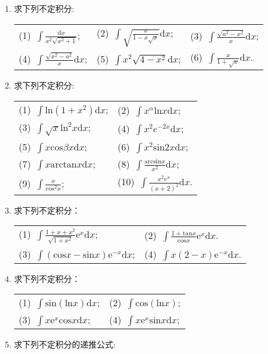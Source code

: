 \begin{enumerate}
\begin{table}[H]
\begin{tabular}{llll}
\end{tabular}
\end{table}
\item 求下列不定积分:
\begin{table}[H]
	\begin{tabular}{lll}
		(1)\ $\int \frac{\mathrm{d}x}{x^2\sqrt{x^2+1}}$;\qquad \qquad \qquad &(2)\ $\int \sqrt{\frac{x}{1-x\sqrt{x}}}\mathrm{d}x$;\qquad \qquad \qquad&(3)\ $\int \frac{\sqrt{a^2-x^2}}{x}\mathrm{d}x$;\\
		(4)\ $\int \frac{\sqrt{x^2-a^2}}{x}\mathrm{d}x$;\qquad \qquad \qquad&(5)\ $\int x^2\sqrt{4-x^2}\mathrm{d}x$;\qquad \qquad &(6)\ $\int \frac{x}{1+\sqrt{x}}\mathrm{d}x$.
	\end{tabular}
\end{table}
\item 求下列不定积分:
\begin{table}[H]
	\begin{tabular}{ll}
		(1)\ $\int \mathrm{ln}(1+x^2)\mathrm{d}x$;\qquad \qquad \qquad \qquad &(2)\ $\int x^\alpha\mathrm{ln}x\mathrm{d}x$;\\
		(3)\ $\int \sqrt{x}\mathrm{ln}^2x\mathrm{d}x$;\qquad \qquad \qquad \qquad &(4)\ $\int x^2e^{-2x}\mathrm{d}x$;\\
		(5)\ $\int x\mathrm{cos}\beta x\mathrm{d}x$;\qquad \qquad \qquad \qquad &(6)\ $\int x^2\mathrm{sin}2x\mathrm{d}x$;\\
		(7)\ $\int x\mathrm{arctan}x \mathrm{d}x$;\qquad \qquad \qquad \qquad &(8)\ $\int \frac{\mathrm{arcsin}x}{x^2}\mathrm{d}x$;\\
		(9)\ $\int \frac{x}{\mathrm{cos}^2x}$;\qquad \qquad \qquad \qquad &(10)\ $\int \frac{x^2e^x}{(x+2)^2}\mathrm{d}x$.
	\end{tabular}
\end{table}
\item 求下列不定积分：
\begin{table}[H]
	\begin{tabular}{ll}
(1)\ $\int \frac{1+x+x^2}{\sqrt{1+x^2}}\mathrm{e}^x\mathrm{d}x$;\qquad \qquad \qquad \qquad &(2)\ $\int \frac{1+\mathrm{tan}x}{\mathrm{cos}x}\mathrm{e}^x\mathrm{d}x$.\\
(3)\ $\int (\mathrm{cos}x-\mathrm{sin}x)\mathrm{e}^{-x}\mathrm{d}x$;\qquad \qquad \qquad \qquad &(4)\ $\int x(2-x)\mathrm{e}^{-x}\mathrm{d}x$.
	\end{tabular}
\end{table}
\item 求下列不定积分：
\begin{table}[H]
	\begin{tabular}{ll}
		(1)\ $\int \mathrm{sin}(\mathrm{ln}x)\mathrm{d}x$; \qquad \qquad \qquad \qquad & (2)\ $\int \mathrm{cos}(\mathrm{ln}x)$;\\
		(3)\ $\int x\mathrm{e}^x\mathrm{cos}x\mathrm{d}x$;\qquad \qquad \qquad \qquad &(4)\ $\int x\mathrm{e}^x\mathrm{sin}x\mathrm{d}x$;
	\end{tabular}
\end{table}
\item 求下列不定积分的递推公式:\\

\end{enumerate}
